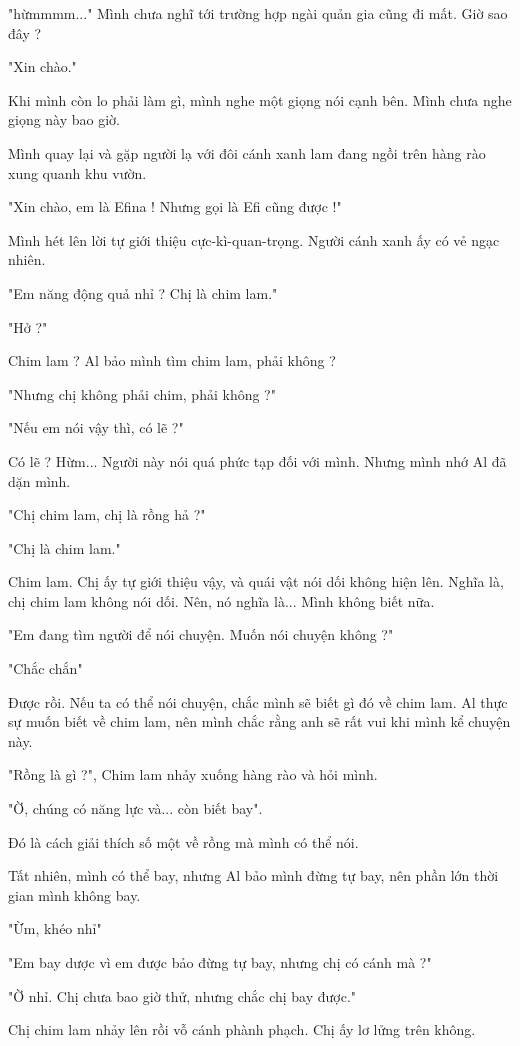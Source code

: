 "hừmmmm..." Mình chưa nghĩ tới trường hợp ngài quản gia cũng đi mất. Giờ sao đây ?

"Xin chào."

Khi mình còn lo phải làm gì, mình nghe một giọng nói cạnh bên. Mình chưa nghe giọng này bao giờ.

Mình quay lại và gặp người lạ với đôi cánh xanh lam đang ngồi trên hàng rào xung quanh khu vườn.

"Xin chào, em là Efina ! Nhưng gọi là Efi cũng được !"

 Mình hét lên lời tự giới thiệu cực-kì-quan-trọng. Người cánh xanh ấy có vẻ ngạc nhiên.
 
 "Em năng động quả nhỉ ? Chị là chim lam."
 
 "Hở ?" 
 
 Chim lam ? Al bảo mình tìm chim lam, phải không ?
 
 "Nhưng chị không phải chim, phải không ?"
 
 "Nếu em nói vậy thì, có lẽ ?"
 
 Có lẽ ? Hừm... Người này nói quá phức tạp đối với mình. Nhưng mình nhớ Al đã dặn mình. 
 
 "Chị chim lam, chị là rồng hả ?"
 
 "Chị là chim lam."
 
 Chim lam. Chị ấy tự giới thiệu vậy, và quái vật nói dối không hiện lên. Nghĩa là, chị chim lam không nói dối. Nên, nó nghĩa là... Mình không biết nữa.
 
 "Em đang tìm người để nói chuyện. Muốn nói chuyện không ?"
 
 "Chắc chắn"
 
 Được rồi. Nếu ta có thể nói chuyện, chắc mình sẽ biết gì đó về chim lam. Al thực sự muốn biết về chim lam, nên mình chắc rằng anh sẽ rất vui khi mình kể chuyện này.
 
 "Rồng là gì ?", Chim lam nhảy xuống hàng rào và hỏi mình. 
 
 "Ờ, chúng có năng lực và... còn biết bay".
 
 Đó là cách giải thích số một về rồng mà mình có thể nói.
 
 Tất nhiên, mình có thể bay, nhưng Al bảo mình đừng tự bay, nên phần lớn thời gian mình không bay.
 
 "Ừm, khéo nhỉ"
 
 "Em bay dược vì em được bảo đừng tự bay, nhưng chị có cánh mà ?"
 
 "Ờ nhỉ. Chị chưa bao giờ thử, nhưng chắc chị bay được."
 
 Chị chim lam nhảy lên rồi vỗ cánh phành phạch. Chị ấy lơ lửng trên không.
 
